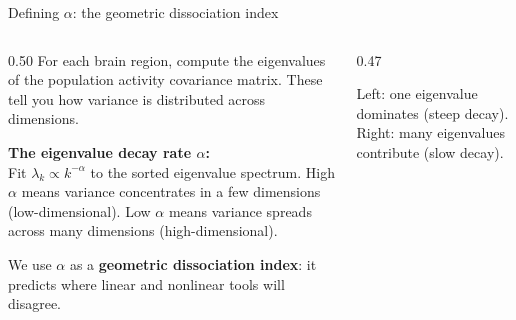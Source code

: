 \documentclass[aspectratio=169,11pt]{beamer}
\begin{document}
\begin{frame}{Defining $\alpha$: the geometric dissociation index}
\begin{columns}[T]
\begin{column}{0.50\textwidth}
{\small For each brain region, compute the eigenvalues of the population activity covariance matrix. These tell you how variance is distributed across dimensions.}

\vspace{0.5em}
\textbf{The eigenvalue decay rate $\alpha$:}\\[0.3em]
{\small Fit $\lambda_k \propto k^{-\alpha}$ to the sorted eigenvalue spectrum. High $\alpha$ means variance concentrates in a few dimensions (low-dimensional). Low $\alpha$ means variance spreads across many dimensions (high-dimensional).}

\vspace{0.5em}
{\small We use $\alpha$ as a \textbf{geometric dissociation index}: it predicts where linear and nonlinear tools will disagree.}
\end{column}
\begin{column}{0.47\textwidth}
\centering
\vspace{0.3em}

\vspace{0.3em}
{\small Left: one eigenvalue dominates (steep decay). Right: many eigenvalues contribute (slow decay).}
\end{column}
\end{columns}
\end{frame}
\end{document}
